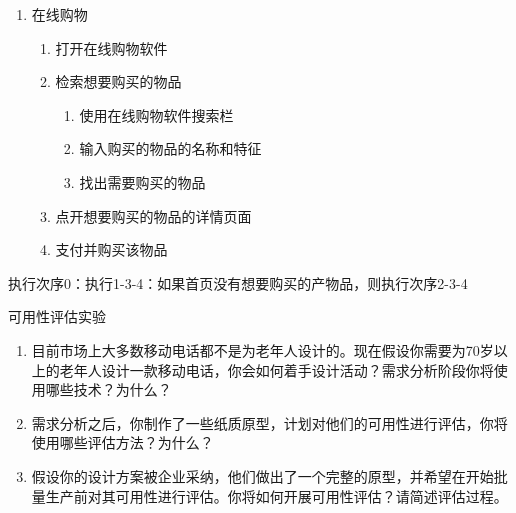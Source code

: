 \begin{solution}
\vspace{-0.8em}
\begin{multicols}{2}
    \begin{enumerate}[label=\arabic*.,start=0]
        \item 在线购物
        \vspace{-0.3em}
        \begin{enumerate}[label=\arabic*.]
            \item 打开在线购物软件
            \item 检索想要购买的物品
            \begin{enumerate}[label=2.\arabic*]
                \item 使用在线购物软件搜索栏
                \item 输入购买的物品的名称和特征
                \item 找出需要购买的物品
            \end{enumerate}
            \item 点开想要购买的物品的详情页面
            \item 支付并购买该物品
        \end{enumerate}
    \end{enumerate}
\end{multicols}
\vspace{-1em}

执行次序0：执行1-3-4：如果首页没有想要购买的产物品，则执行次序2-3-4
\end{solution}



\begin{problem}
可用性评估实验

\begin{enumerate}[label=\arabic*.]
    \item 目前市场上大多数移动电话都不是为老年人设计的。现在假设你需要为70岁以上的老年人设计一款移动电话，你会如何着手设计活动？需求分析阶段你将使用哪些技术？为什么？
    \item 需求分析之后，你制作了一些纸质原型，计划对他们的可用性进行评估，你将使用哪些评估方法？为什么？
    \item 假设你的设计方案被企业采纳，他们做出了一个完整的原型，并希望在开始批量生产前对其可用性进行评估。你将如何开展可用性评估？请简述评估过程。
\end{enumerate}
\end{problem}

